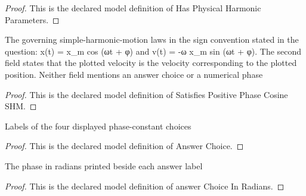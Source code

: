 \begin{proof}
  This is the declared model definition of Has Physical Harmonic Parameters.
\end{proof}
\begin{definition}
  \label{def:physics:phyx-mini-0254:phyxminiproblems-problemphyxmini0254-satisfiespositivephasecosineshm}
  The governing simple-harmonic-motion laws in the sign convention stated in the question: x(t) = x\_m cos (ωt + φ) and v(t) = -ω x\_m sin (ωt + φ). The second field states that the plotted velocity is the velocity corresponding to the plotted position. Neither field mentions an answer choice or a numerical phase
\end{definition}
\begin{proof}
  This is the declared model definition of Satisfies Positive Phase Cosine SHM.
\end{proof}
\begin{definition}
  \label{def:physics:phyx-mini-0254:phyxminiproblems-problemphyxmini0254-answerchoice}
  Labels of the four displayed phase-constant choices
\end{definition}
\begin{proof}
  This is the declared model definition of Answer Choice.
\end{proof}
\begin{definition}
  \label{def:physics:phyx-mini-0254:phyxminiproblems-problemphyxmini0254-answerchoiceinradians}
  The phase in radians printed beside each answer label
\end{definition}
\begin{proof}
  This is the declared model definition of answer Choice In Radians.
\end{proof}
